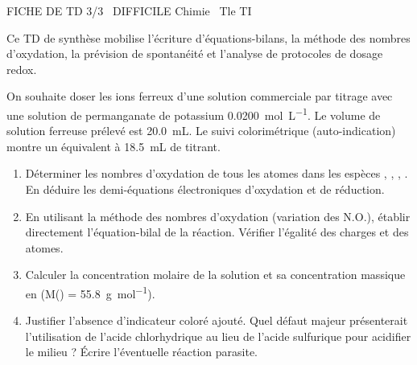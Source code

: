 \documentclass[11pt]{article}
\begin{document}
\begin{tcolorbox}[enhanced,colback=popink,colframe=popink,arc=10pt,boxrule=0pt,left=12pt,right=12pt,top=9pt,bottom=9pt]
{\color{white}\popxbold\small FICHE DE TD 3/3 \textbullet\ DIFFICILE \hfill Chimie \textbullet\ Tle TI\par}
\end{tcolorbox}
\vspace{4pt}
Ce TD de synthèse mobilise l'écriture d'équations-bilans, la méthode des nombres d'oxydation, la prévision de spontanéité et l'analyse de protocoles de dosage redox.

\begin{exercice}
On souhaite doser les ions ferreux  d'une solution commerciale  par titrage avec une solution de permanganate de potassium  \SI{0.0200}{\mol\per\liter}. 
Le volume de solution ferreuse prélevé est \SI{20.0}{\milli\liter}. Le suivi colorimétrique (auto-indication) montre un équivalent à \SI{18.5}{\milli\liter} de titrant.
\begin{enumerate}
    \item Déterminer les nombres d'oxydation de tous les atomes dans les espèces , , , . En déduire les demi-équations électroniques d'oxydation et de réduction.
    \item En utilisant la méthode des nombres d'oxydation (variation des N.O.), établir directement l'équation-bilal de la réaction. Vérifier l'égalité des charges et des atomes.
    \item Calculer la concentration molaire de la solution  et sa concentration massique en  (M() = \SI{55.8}{\gram\per\mol}).
    \item Justifier l'absence d'indicateur coloré ajouté. Quel défaut majeur présenterait l'utilisation de l'acide chlorhydrique au lieu de l'acide sulfurique pour acidifier le milieu ? Écrire l'éventuelle réaction parasite.
\end{enumerate}
\end{exercice}
\end{document}
